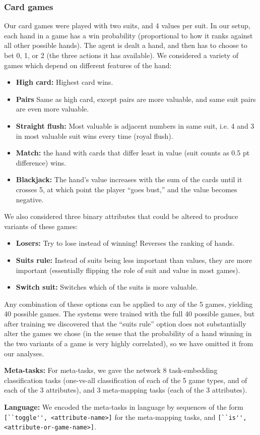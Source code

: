 \documentclass{article}
\begin{document}
\subsubsection{Card games}
\label{meth_data_cards}
Our card games were played with two suits, and 4 values per suit. In our setup, each hand in a game has a win probability (proportional to how it ranks against all other possible hands). The agent is dealt a hand, and then has to choose to bet 0, 1, or 2 (the three actions it has available). We considered a variety of games which depend on different features of the hand: 
\begin{itemize}
\item \textbf{High card:} Highest card wins.
\item \textbf{Pairs} Same as high card, except pairs are more valuable, and same suit pairs are even more valuable.
\item \textbf{Straight flush:} Most valuable is adjacent numbers in same suit, i.e. 4 and 3 in most valuable suit wins every time (royal flush).
\item \textbf{Match:} the hand with cards that differ least in value (suit counts as 0.5 pt difference) wins.
\item \textbf{Blackjack:} The hand's value increases with the sum of the cards until it crosses 5, at which point the player ``goes bust,'' and the value becomes negative. 
\end{itemize}
We also considered three binary attributes that could be altered to produce variants of these games:
\begin{itemize}
\item \textbf{Losers:} Try to lose instead of winning! Reverses the ranking of hands.
\item \textbf{Suits rule:} Instead of suits being less important than values, they are more important (essentially flipping the role of suit and value in most games).
\item \textbf{Switch suit:} Switches which of the suits is more valuable.
\end{itemize}
Any combination of these options can be applied to any of the 5 games, yielding 40 possible games. The systems were trained with the full 40 possible games, but after training we discovered that the ``suits rule'' option does not substantially alter the games we chose (in the sense that the probability of a hand winning in the two variants of a game is very highly correlated), so we have omitted it from our analyses.\par
\textbf{Meta-tasks:} For meta-tasks, we gave the network 8 task-embedding classification tasks (one-vs-all classification of each of the 5 game types, and of each of the 3 attributes), and 3 meta-mapping tasks (each of the 3 attributes). \par
\textbf{Language:} We encoded the meta-tasks in language by sequences of the form \verb|[``toggle'', <attribute-name>]| for the meta-mapping tasks, and \verb|[``is'', <attribute-or-game-name>]|.
\end{document}
